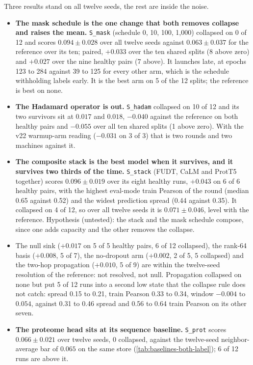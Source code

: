  Three results stand on all twelve seeds, the rest are inside the
noise.
\begin{itemize}
  \item \textbf{The mask schedule is the one change that both removes collapse and raises
  the mean.} \texttt{S\_mask} (schedule 0, 10, 100, 1{,}000) collapsed on 0 of 12 and scores
  $0.094 \pm 0.028$ over all twelve seeds against $0.063 \pm 0.037$ for the reference over
  its ten; paired, $+0.033$ over the ten shared splits (8 above zero) and $+0.027$ over the
  nine healthy pairs (7 above). It launches late, at epochs 123 to 284 against 39 to 125 for
  every other arm, which is the schedule withholding labels early. It is the best arm on 5
  of the 12 splits; the reference is best on none.
  \item \textbf{The Hadamard operator is out.} \texttt{S\_hadam} collapsed on 10 of 12 and
  its two survivors sit at $0.017$ and $0.018$, $-0.040$ against the reference on both
  healthy pairs and $-0.055$ over all ten shared splits (1 above zero). With the v22
  warmup-arm reading ($-0.031$ on 3 of 3) that is two rounds and two machines against it.
  \item \textbf{The composite stack is the best model when it survives, and it survives
  two thirds of the time.} \texttt{S\_stack} (FUDT, CaLM and ProtT5 together) scores
  $0.096 \pm 0.019$ over its eight healthy runs, $+0.043$ on 6 of 6 healthy pairs, with the
  highest eval-mode train Pearson of the round (median 0.65 against 0.52) and the widest
  prediction spread (0.44 against 0.35). It collapsed on 4 of 12, so over all twelve seeds it
  is $0.071 \pm 0.046$, level with the reference. Hypothesis (untested): the stack and the
  mask schedule compose, since one adds capacity and the other removes the collapse.
  \item The null sink ($+0.017$ on 5 of 5 healthy pairs, 6 of 12 collapsed), the rank-64
  basis ($+0.008$, 5 of 7), the no-dropout arm ($+0.002$, 2 of 5, 5 collapsed) and the
  two-hop propagation ($+0.010$, 5 of 9) are within the twelve-seed resolution of the
  reference: not resolved, not null. Propagation collapsed on none but put 5 of 12 runs into
  a second low state that the collapse rule does not catch: spread 0.15 to 0.21, train
  Pearson 0.33 to 0.34, window $-0.004$ to $0.054$, against 0.31 to 0.46 spread and 0.56 to
  0.64 train Pearson on its other seven.
  \item \textbf{The proteome head sits at its sequence baseline.} \texttt{S\_prot} scores
  $0.066 \pm 0.021$ over twelve seeds, 0 collapsed, against the twelve-seed neighbor-average
  bar of $0.065$ on the same store (\cref{tab:baselines-both-label}); 6 of 12 runs are above
  it.
\end{itemize}

